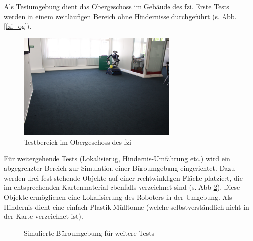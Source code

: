 Als Testumgebung dient das Obergeschoss im Gebäude des \gls{fzi}.
Erste Tests werden in einem weitläufigen Bereich ohne Hindernisse durchgeführt (s. Abb. \ref{fzi_og}).
\begin{figure}
	\centering
	\includegraphics[width=0.7\textwidth]{graphics/fzi_og}
	\caption{Testbereich im Obergeschoss des \protect\gls{fzi}}
	\label{fig:fzi_og}
\end{figure}

Für weitergehende Tests (Lokalisierug, Hindernis-Umfahrung etc.) wird ein abgegrenzter Bereich zur Simulation einer Büroumgebung eingerichtet.
Dazu werden drei fest stehende Objekte auf einer rechtwinkligen Fläche platziert, die im entsprechenden Kartenmaterial ebenfalls verzeichnet sind (s. Abb \ref{fig:map_fzi}).
Diese Objekte ermöglichen eine Lokalisierung des Roboters in der Umgebung.
Als Hindernis dient eine einfach Plastik-Mülltonne (welche selbstverständlich nicht in der Karte verzeichnet ist).

\begin{figure}[h]
  \centering
  \quad %
  \caption{Simulierte Büroumgebung für weitere Tests}
  \label{fig:map_fzi}
\end{figure}


